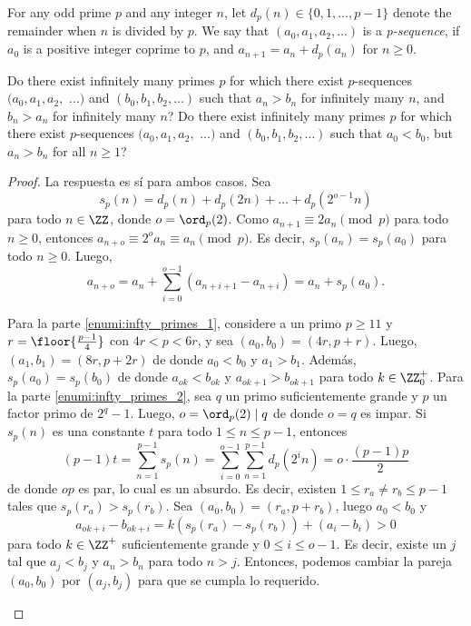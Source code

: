 \begin{probMG}[ISL 2020/N4]
	For any odd prime $p$ and any integer $n$, let $d_p(n)\in\{0,1,\dots,p-1\}$ denote the remainder when $n$ is divided by $p$. We say that $(a_0,a_1,a_2,\dots)$ is a \emph{p-sequence}, if $a_0$ is a positive integer coprime to $p$, and $a_{n+1}=a_n+d_p(a_n)$ for $n\ge 0$.
	\begin{enumerate}[(a)]
		\ii \label{enumi:infty_primes_1} Do there exist infinitely many primes $p$ for which there exist $p$-sequences $(a_0,a_1,a_2,$ $\dots)$ and $(b_0,b_1,b_2,\dots)$ such that $a_n>b_n$ for infinitely many $n$, and $b_n>a_n$ for infinitely many $n$?
		\ii \label{enumi:infty_primes_2} Do there exist infinitely many primes $p$ for which there exist $p$-sequences $(a_0,a_1,a_2,$ $\dots)$ and $(b_0,b_1,b_2,\dots)$ such that $a_0<b_0$, but $a_n>b_n$ for all $n\ge 1$?
	\end{enumerate}
\end{probMG}

\begin{proof}
	La respuesta es sí para ambos casos. Sea
	\[s_p(n)=d_p(n)+d_p(2n)+\dots+d_p(2^{o-1}n)\]
	para todo $n\in\ZZ$, donde $o=\ord_{p}(2)$. Como $a_{n+1}\equiv 2a_n\pmod p$ para todo $n\ge 0$, entonces $a_{n+o}\equiv 2^oa_n\equiv a_n\pmod p$. Es decir, $s_p(a_n)=s_p(a_0)$ para todo $n\ge 0$. Luego,
	\[a_{n+o}=a_n+\sum_{i=0}^{o-1}(a_{n+i+1}-a_{n+i})=a_n+s_p(a_0).\]
	\begin{itemize}
		\ii Para la parte \ref{enumi:infty_primes_1}, considere a un primo $p\ge 11$ y $r=\floor{\frac{p-1}{4}}$ con $4r<p<6r$, y sea $(a_0,b_0)=(4r,p+r)$. Luego, $(a_1,b_1)=(8r,p+2r)$ de donde $a_0<b_0$ y $a_1>b_1$. Además, $s_p(a_0)=s_p(b_0)$ de donde $a_{ok}<b_{ok}$ y $a_{ok+1}>b_{ok+1}$ para todo $k\in\ZZ^+_0$.
		\ii Para la parte \ref{enumi:infty_primes_2}, sea $q$ un primo suficientemente grande y $p$ un factor primo de $2^q-1$. Luego, $o=\ord_p(2)\mid q$ de donde $o=q$ es impar. Si $s_p(n)$ es una constante $t$ para todo $1\le n\le p-1$, entonces
		\[(p-1)t=\sum_{n=1}^{p-1}s_p(n)=\sum_{i=0}^{o-1}\sum_{n=1}^{p-1}d_p(2^in)=o\cdot\frac{(p-1)p}{2}\]
		de donde $op$ es par, lo cual es un absurdo. Es decir, existen $1\le r_a\ne r_b\le p-1$ tales que $s_p(r_a)>s_p(r_b)$. Sea $(a_0,b_0)=(r_a,p+r_b)$, luego $a_0<b_0$ y
		\[a_{ok+i}-b_{ok+i}=k(s_p(r_a)-s_p(r_b))+(a_i-b_i)>0\]
		para todo $k\in\ZZ^+$ suficientemente grande y $0\le i\le o-1$. Es decir, existe un $j$ tal que $a_j<b_j$ y $a_n>b_n$ para todo $n>j$. Entonces, podemos cambiar la pareja $(a_0,b_0)$ por $(a_j,b_j)$ para que se cumpla lo requerido.
	\end{itemize}
\end{proof}



